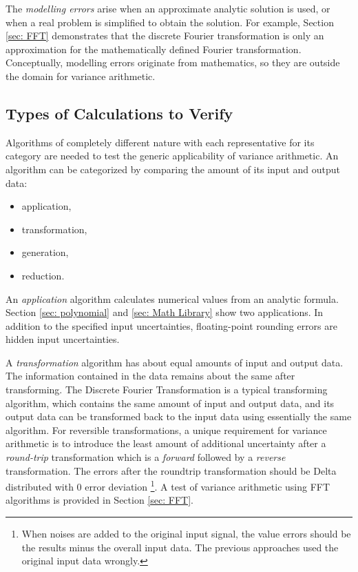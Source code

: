 \documentclass[twoside]{article}
\numberwithin{equation}{section}
\begin{document}
The \emph{modelling errors} arise when an approximate analytic solution is used, or when a real problem is simplified to obtain the solution.  
For example, Section \ref{sec: FFT} demonstrates that the discrete Fourier transformation is only an approximation for the mathematically defined Fourier transformation.  
Conceptually, modelling errors originate from mathematics, so they are outside the domain for variance arithmetic.


\subsection{Types of Calculations to Verify \cite{Prev_Precision_Arithmetic}}

Algorithms of completely different nature with each representative for its category are needed to test the generic applicability of variance arithmetic.  
An algorithm can be categorized by comparing the amount of its input and output data:
\begin{itemize}
\item application,
\item transformation,
\item generation,
\item reduction.
\end{itemize}

An \emph{application} algorithm calculates numerical values from an analytic formula. 
Section \ref{sec: polynomial} and \ref{sec: Math Library} show two applications.
In addition to the specified input uncertainties, floating-point rounding errors are hidden input uncertainties.

A \emph{transformation} algorithm has about equal amounts of input and output data.  
The information contained in the data remains about the same after transforming.  
The Discrete Fourier Transformation is a typical transforming algorithm, which contains the same amount of input and output data, and its output data can be transformed back to the input data using essentially the same algorithm.  
For reversible transformations, a unique requirement for variance arithmetic is to introduce the least amount of additional uncertainty after a \emph{round-trip} transformation which is a \emph{forward} followed by a \emph{reverse} transformation.  
The errors after the roundtrip transformation should be Delta distributed with $0$ error deviation \footnote{When noises are added to the original input signal, the value errors should be the results minus the overall input data. The previous approaches \cite{Prev_Precision_Arithmetic} used the original input data wrongly.}.
A test of variance arithmetic using FFT algorithms is provided in Section \ref{sec: FFT}.
\end{document}
